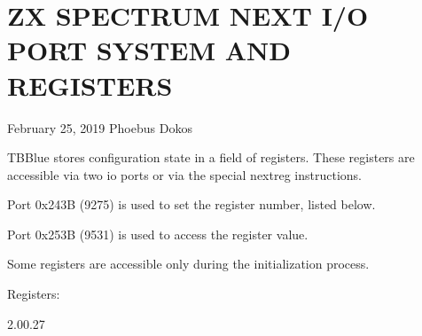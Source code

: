 \section{ZX SPECTRUM NEXT I/O PORT SYSTEM AND REGISTERS}
February 25, 2019  Phoebus Dokos

TBBlue stores configuration state in a field of registers. These
registers are accessible via two io ports or via the special nextreg
instructions.

Port 0x243B (9275) is used to set the register number, listed below.

Port 0x253B (9531) is used to access the register value.

Some registers are accessible only during the initialization process.

Registers:

2.00.27

